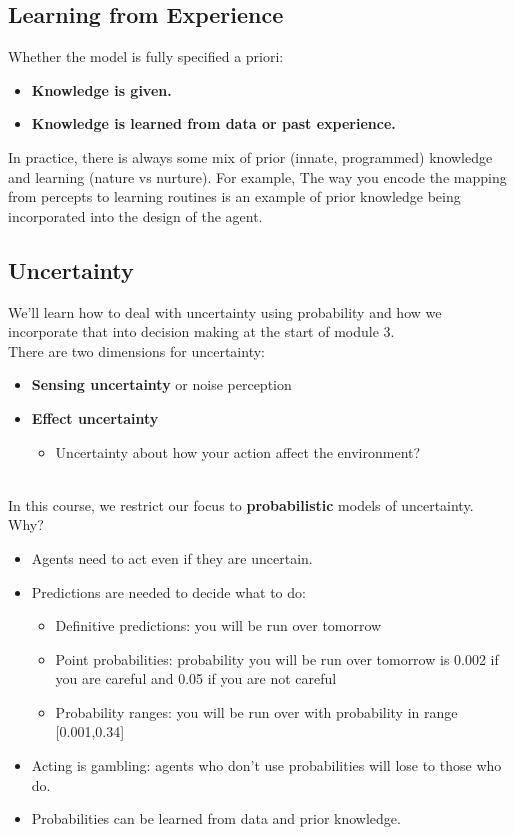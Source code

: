 \documentclass[12pt]{article}
\begin{document}
\subsection*{Learning from Experience}
Whether the model is fully specified a priori:

\begin{itemize}
    \item \textbf{Knowledge is given.}
    \item \textbf{Knowledge is learned from data or past experience.}
\end{itemize}

\noindent In practice, there is always some mix of prior (innate, programmed) knowledge and learning (nature vs nurture). For example, The way you encode the mapping from percepts to learning routines is an example of prior knowledge being incorporated into the design of the agent. 

\subsection*{Uncertainty}
We'll learn how to deal with uncertainty using probability and how we incorporate that into decision making at the start of module 3.\\
\noindent There are two dimensions for uncertainty:

\begin{itemize}
    \item \textbf{Sensing uncertainty} or noise perception
    \item \textbf{Effect uncertainty}
    \begin{itemize}
        \item Uncertainty about how your action affect the environment? 
    \end{itemize}
\end{itemize}\\

In this course, we restrict our focus to \textbf{probabilistic} models of uncertainty. Why?

\begin{itemize}
    \item Agents need to act even if they are uncertain.
    \item Predictions are needed to decide what to do:
    \begin{itemize}
        \item Definitive predictions: you will be run over tomorrow
        \item Point probabilities: probability you will be run over tomorrow is 0.002 if you are careful and
0.05 if you are not careful
        \item Probability ranges: you will be run over with probability in range [0.001,0.34]
    \end{itemize}
    \item Acting is gambling: agents who don’t use probabilities will lose to those who do.
    \item Probabilities can be learned from data and prior knowledge.
\end{itemize}
\end{document}
